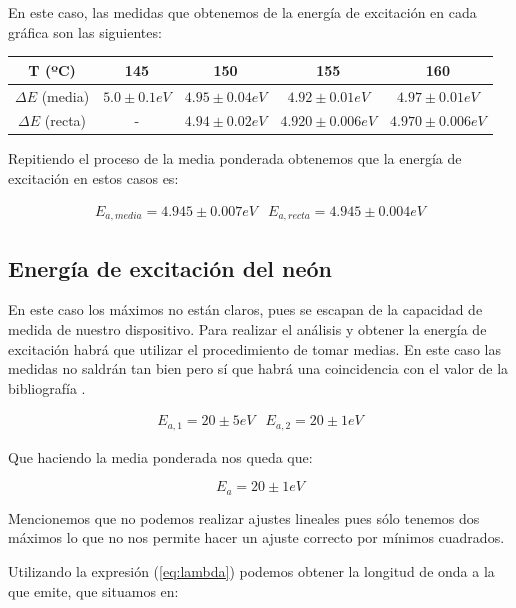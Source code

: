 \documentclass{article}
\begin{document}
En este caso, las medidas que obtenemos de la energía de excitación en cada gráfica son las siguientes:

\begin{center}
\hspace*{-0.25cm}\begin{tabular}{|c|c|c|c|c|}
\hline
T (ºC) & 145 & 150 & 155 & 160 \\ \hline \hline
$\Delta E$ (media) & $5.0 \pm 0.1 eV$ & $4.95 \pm 0.04 eV$ & $4.92 \pm 0.01 eV$ & $4.97 \pm 0.01 eV$ \\
$\Delta E$ (recta) & - & $4.94 \pm 0.02 eV$ & $4.920 \pm 0.006 eV$ & $4.970 \pm 0.006 eV$ \\ \hline
\end{tabular}
\end{center}

Repitiendo el proceso de la media ponderada obtenemos que la energía de excitación en estos casos es:

$$
\begin{array}{cc}
E_{a, media} = 4.945 \pm 0.007 eV & E_{a, recta} = 4.945 \pm 0.004 eV
\end{array}
$$

\subsection{Energía de excitación del neón}

En este caso los máximos no están claros, pues se escapan de la capacidad de medida de nuestro dispositivo. Para realizar el análisis y obtener la energía de excitación habrá que utilizar el procedimiento de tomar medias. En este caso las medidas no saldrán tan bien pero sí que habrá una coincidencia con el valor de la bibliografía \cite{Neon}.

$$
\begin{array}{cc}
E_{a, 1} = 20 \pm 5 eV & E_{a, 2} = 20 \pm 1 eV
\end{array}
$$

Que haciendo la media ponderada nos queda que:

$$
E_a = 20 \pm 1 eV
$$

Mencionemos que no podemos realizar ajustes lineales pues sólo tenemos dos máximos lo que no nos permite hacer un ajuste correcto por mínimos cuadrados.

Utilizando la expresión (\ref{eq:lambda}) podemos obtener la longitud de onda a la que emite, que situamos en:
\end{document}
